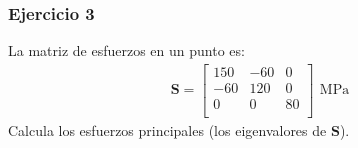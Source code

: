 \documentclass[12pt]{beamer}
\begin{document}
\begin{frame}
\frametitle{Ejercicio 3}
La matriz de esfuerzos en un punto es:
\renewcommand{\arraystretch}{1}
\begin{align*}
\mathbf{S} = 
\begin{bmatrix}
150 & -60 & 0 \\
-60 & 120 & 0 \\
0 & 0 & 80 \\
\end{bmatrix} \, \SI{}{\mega\pascal}
\end{align*}
Calcula los esfuerzos principales (los eigenvalores de $\mathbf{S}$).
\end{frame}
\end{document}
